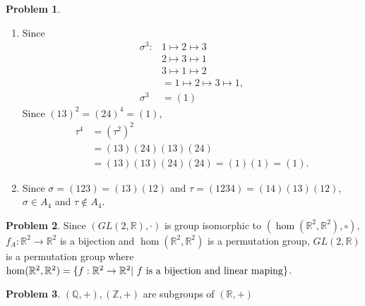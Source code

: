 \documentclass[a4paper, 12pt, fleqn, openany]{article}
\theoremstyle{definition}
\newtheorem{prb}{Problem}
\begin{document}
\begin{prb}
\begin{enumerate}
        \item Since
            \begin{align*}
                \sigma ^3 :
                        &1 \mapsto 2 \mapsto 3\\
                        &2 \mapsto 3 \mapsto 1\\
                        &3 \mapsto 1 \mapsto 2\\
                        &=1 \mapsto 2 \mapsto 3 \mapsto 1,\\
              \sigma ^3 &= (1)
            \end{align*}
            Since $(13)^2 = (24)^4 = (1)$,
            \begin{align*}
                \tau^4 &= (\tau^2)^2 \\
                       &= (13)(24)(13)(24)\\
                       &= (13)(13)(24)(24) = (1)(1) = (1).
            \end{align*}

        \item
            Since $\sigma = (123)=(13)(12)$ and $\tau = (1234) = (14)(13)(12)$, $\sigma \in A_4$ and $\tau \notin A_4$.
    \end{enumerate}
\end{prb}

\begin{prb}
    Since $(GL(2,\mathbb{R}),\cdot )$ is group isomorphic to $(\hom (\mathbb{R}^2,\mathbb{R}^2),\circ)$, $f_A :\mathbb{R}^2 \to \mathbb{R}^2$ is a bijection and $\hom(\mathbb{R}^2,\mathbb{R}^2)$ is a permutation group, $GL(2,\mathbb{R})$ is a permutation group where $\hom(\mathbb{R}^2,\mathbb{R}^2) = \{f:\mathbb{R}^2 \to \mathbb{R}^2  |\ f{\rm\ is\ a\ bijection\ and\ linear\ maping}\}$.
\end{prb}

\begin{prb}
    $(\mathbb{Q},+),(\mathbb{Z},+)$ are subgroups of $(\mathbb{R},+)$
\end{prb}
\end{document}
